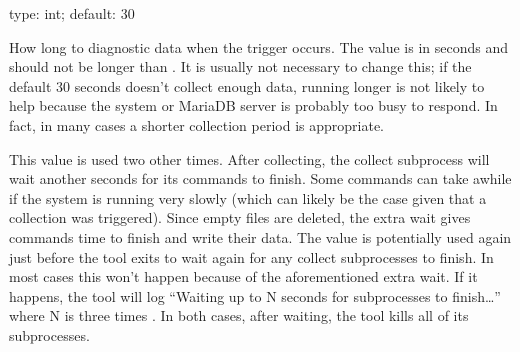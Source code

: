 \documentclass[letterpaper,10pt,english]{sphinxmanual}
\begin{document}
\begin{fulllineitems}
\label{\detokenize{mariadb-stat:cmdoption-mariadb-stat-run-time}}
\sphinxAtStartPar
type: int; default: 30

\sphinxAtStartPar
How long to {\hyperref[\detokenize{mariadb-stat:cmdoption-mariadb-stat-collect}]{}} diagnostic data when the trigger occurs.
The value is in seconds and should not be longer than {\hyperref[\detokenize{mariadb-stat:cmdoption-mariadb-stat-sleep}]{}}.  It is
usually not necessary to change this; if the default 30 seconds doesn’t
collect enough data, running longer is not likely to help because the system
or MariaDB server is probably too busy to respond.  In fact, in many cases a
shorter collection period is appropriate.

\sphinxAtStartPar
This value is used two other times.  After collecting, the collect subprocess
will wait another {\hyperref[\detokenize{mariadb-stat:cmdoption-mariadb-stat-run-time}]{}} seconds for its commands to finish.  Some
commands can take awhile if the system is running very slowly (which can
likely be the case given that a collection was triggered).  Since empty files
are deleted, the extra wait gives commands time to finish and write their
data.  The value is potentially used again just before the tool exits to wait
again for any collect subprocesses to finish.  In most cases this won’t
happen because of the aforementioned extra wait.  If it happens, the tool
will log “Waiting up to N seconds for subprocesses to finish…” where N is
three times {\hyperref[\detokenize{mariadb-stat:cmdoption-mariadb-stat-run-time}]{}}.  In both cases, after waiting, the tool kills
all of its subprocesses.

\end{fulllineitems}

\end{document}
